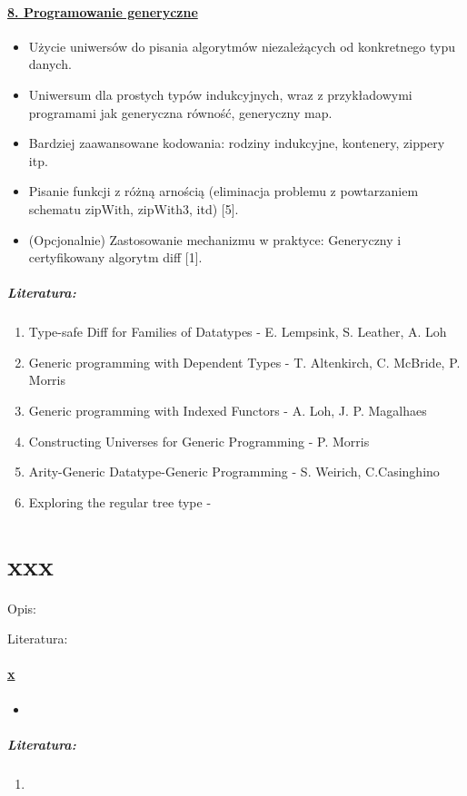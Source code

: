 \documentclass[10pt, a4paper]{article}
\begin{document}
\paragraph{\underline{8. Programowanie generyczne}}


\begin{itemize}
\addtolength{\itemsep}{-0.5\baselineskip}

\item Użycie uniwersów do pisania algorytmów niezależących od konkretnego typu danych.
\item Uniwersum dla prostych typów indukcyjnych, wraz z przykładowymi programami jak generyczna równość, generyczny map.
\item Bardziej zaawansowane kodowania: rodziny indukcyjne, kontenery, zippery itp.
\item Pisanie funkcji z różną arnością (eliminacja problemu z powtarzaniem schematu zipWith, zipWith3, itd) [5].
\item (Opcjonalnie) Zastosowanie mechanizmu w praktyce: Generyczny i certyfikowany algorytm diff [1].

\end{itemize}


\subparagraph{Literatura:}


\begin{enumerate}
\addtolength{\itemsep}{-0.5\baselineskip}

\item  Type-safe Diff for Families of Datatypes - E. Lempsink, S. Leather, A. Loh
\item  Generic programming with Dependent Types - T. Altenkirch, C. McBride, P. Morris
\item  Generic programming with Indexed Functors - A. Loh, J. P. Magalhaes
\item  Constructing Universes for Generic Programming - P. Morris
\item  Arity-Generic Datatype-Generic Programming - S. Weirich, C.Casinghino
\item  Exploring the regular tree type -

\end{enumerate}

\section{xxx}

Opis: 

Literatura:    
    
\paragraph{\underline{x}}

\begin{itemize}
\addtolength{\itemsep}{-0.5\baselineskip}

 \item 
\end{itemize}

\subparagraph{Literatura:}

\begin{enumerate}
\addtolength{\itemsep}{-0.5\baselineskip}

 \item 
\end{enumerate}
\end{document}
